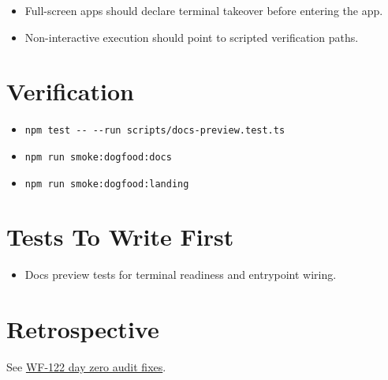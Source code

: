 \begin{itemize}
\tightlist
\item
  Full-screen apps should declare terminal takeover before entering the app.
\item
  Non-interactive execution should point to scripted verification paths.
\end{itemize}

\section{Verification}\label{record-119-verification}

\begin{itemize}
\tightlist
\item
  \texttt{n\allowbreak{}p\allowbreak{}m\allowbreak{} \allowbreak{}t\allowbreak{}e\allowbreak{}s\allowbreak{}t\allowbreak{} \allowbreak{}-\allowbreak{}-\allowbreak{} \allowbreak{}-\allowbreak{}-\allowbreak{}r\allowbreak{}u\allowbreak{}n\allowbreak{} \allowbreak{}s\allowbreak{}c\allowbreak{}r\allowbreak{}i\allowbreak{}p\allowbreak{}t\allowbreak{}s\allowbreak{}/\allowbreak{}d\allowbreak{}o\allowbreak{}c\allowbreak{}s\allowbreak{}-\allowbreak{}p\allowbreak{}r\allowbreak{}e\allowbreak{}v\allowbreak{}i\allowbreak{}e\allowbreak{}w\allowbreak{}.\allowbreak{}t\allowbreak{}e\allowbreak{}s\allowbreak{}t\allowbreak{}.\allowbreak{}t\allowbreak{}s}
\item
  \texttt{n\allowbreak{}p\allowbreak{}m\allowbreak{} \allowbreak{}r\allowbreak{}u\allowbreak{}n\allowbreak{} \allowbreak{}s\allowbreak{}m\allowbreak{}o\allowbreak{}k\allowbreak{}e\allowbreak{}:\allowbreak{}d\allowbreak{}o\allowbreak{}g\allowbreak{}f\allowbreak{}o\allowbreak{}o\allowbreak{}d\allowbreak{}:\allowbreak{}d\allowbreak{}o\allowbreak{}c\allowbreak{}s}
\item
  \texttt{n\allowbreak{}p\allowbreak{}m\allowbreak{} \allowbreak{}r\allowbreak{}u\allowbreak{}n\allowbreak{} \allowbreak{}s\allowbreak{}m\allowbreak{}o\allowbreak{}k\allowbreak{}e\allowbreak{}:\allowbreak{}d\allowbreak{}o\allowbreak{}g\allowbreak{}f\allowbreak{}o\allowbreak{}o\allowbreak{}d\allowbreak{}:\allowbreak{}l\allowbreak{}a\allowbreak{}n\allowbreak{}d\allowbreak{}i\allowbreak{}n\allowbreak{}g}
\end{itemize}

\section{Tests To Write First}\label{record-119-tests-to-write-first}

\begin{itemize}
\tightlist
\item
  Docs preview tests for terminal readiness and entrypoint wiring.
\end{itemize}

\section{Retrospective}\label{record-119-retrospective}

See \href{https://github.com/flyingrobots/bijou/blob/cbd70612140e7a450d764b3c7be1c6af878b99bc/docs/method/retro/WF-122-day-zero-audit-fixes.md}{WF-122 day zero audit fixes}.

